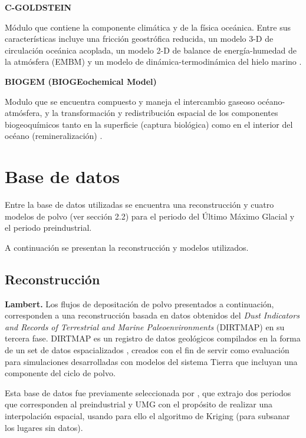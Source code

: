 \begin{description}

\item{\bf C-GOLDSTEIN}

Módulo que contiene la componente climática y de la física oceánica. Entre sus características incluye una fricción geostrófica reducida, un modelo 3-D de circulación oceánica acoplada, un modelo 2-D de balance de energía-humedad de la atmósfera (EMBM) y un modelo de dinámica-termodinámica del hielo marino \citep{edwards2005uncertainties}.

\item{\bf BIOGEM (BIOGEochemical Model)}

Modulo que se encuentra compuesto y maneja el intercambio gaseoso océano-atmósfera, y la transformación y redistribución espacial de los componentes biogeoquímicos tanto en la superficie (captura biológica) como en el interior del océano (remineralización) \citep{ridgwell2007regulation}. 

\end{description}

 \section{Base de datos}

Entre la base de datos utilizadas se encuentra una reconstrucción y cuatro modelos de polvo (ver secci\'on 2.2) para el periodo del Último Máximo Glacial y el periodo preindustrial. 

A continuaci\'on se presentan la reconstrucci\'on y modelos utilizados.

\subsection{Reconstrucción}

 {\bf Lambert.} Los flujos de depositación de polvo presentados a continuación, corresponden a una reconstrucción basada en datos obtenidos del \textit{Dust Indicators and Records of Terrestrial and Marine Paleoenvironments} (DIRTMAP) en su tercera fase. DIRTMAP es un registro de datos geológicos compilados en la forma de un set de datos espacializados \citep{kohfeld2001dirtmap}, creados con el fin de servir como evaluación para simulaciones desarrolladas con modelos del sistema Tierra que incluyan una componente del ciclo de polvo. 

Esta base de datos fue previamente seleccionada por \cite{lambert2015dust}, que extrajo dos periodos que corresponden al preindustrial y UMG con el propósito de realizar una interpolación espacial, usando para ello el algoritmo de Kriging (para subsanar los lugares sin datos).

